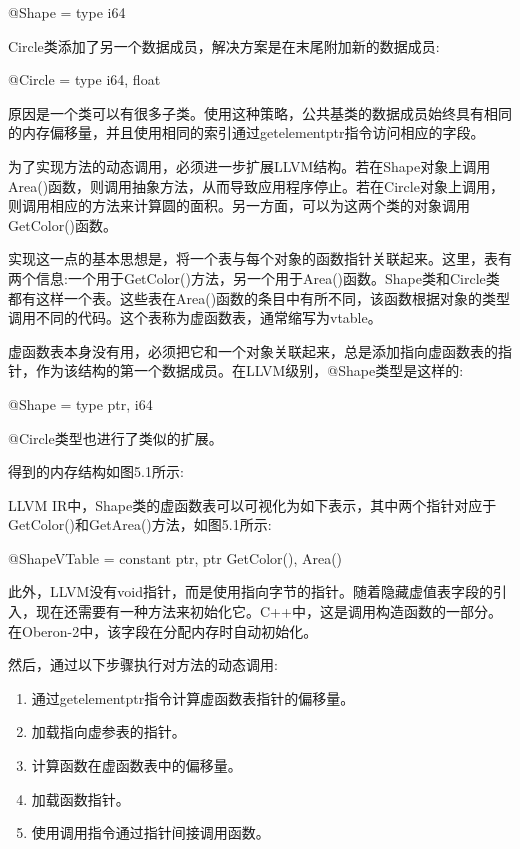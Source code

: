 \begin{shell}
@Shape = type { i64 }
\end{shell}

Circle类添加了另一个数据成员，解决方案是在末尾附加新的数据成员:

\begin{shell}
@Circle = type { i64, float }
\end{shell}


原因是一个类可以有很多子类。使用这种策略，公共基类的数据成员始终具有相同的内存偏移量，并且使用相同的索引通过getelementptr指令访问相应的字段。

为了实现方法的动态调用，必须进一步扩展LLVM结构。若在Shape对象上调用Area()函数，则调用抽象方法，从而导致应用程序停止。若在Circle对象上调用，则调用相应的方法来计算圆的面积。另一方面，可以为这两个类的对象调用GetColor()函数。

实现这一点的基本思想是，将一个表与每个对象的函数指针关联起来。这里，表有两个信息:一个用于GetColor()方法，另一个用于Area()函数。Shape类和Circle类都有这样一个表。这些表在Area()函数的条目中有所不同，该函数根据对象的类型调用不同的代码。这个表称为虚函数表，通常缩写为vtable。

虚函数表本身没有用，必须把它和一个对象关联起来，总是添加指向虚函数表的指针，作为该结构的第一个数据成员。在LLVM级别，@Shape类型是这样的:

\begin{shell}
@Shape = type { ptr, i64 }
\end{shell}

@Circle类型也进行了类似的扩展。

得到的内存结构如图5.1所示:


LLVM IR中，Shape类的虚函数表可以可视化为如下表示，其中两个指针对应于GetColor()和GetArea()方法，如图5.1所示:

\begin{shell}
@ShapeVTable = constant { ptr, ptr } { GetColor(), Area() }
\end{shell}

此外，LLVM没有void指针，而是使用指向字节的指针。随着隐藏虚值表字段的引入，现在还需要有一种方法来初始化它。C++中，这是调用构造函数的一部分。在Oberon-2中，该字段在分配内存时自动初始化。

然后，通过以下步骤执行对方法的动态调用:

\begin{enumerate}
\item
通过getelementptr指令计算虚函数表指针的偏移量。

\item
加载指向虚参表的指针。

\item
计算函数在虚函数表中的偏移量。

\item
加载函数指针。

\item
使用调用指令通过指针间接调用函数。
\end{enumerate}

